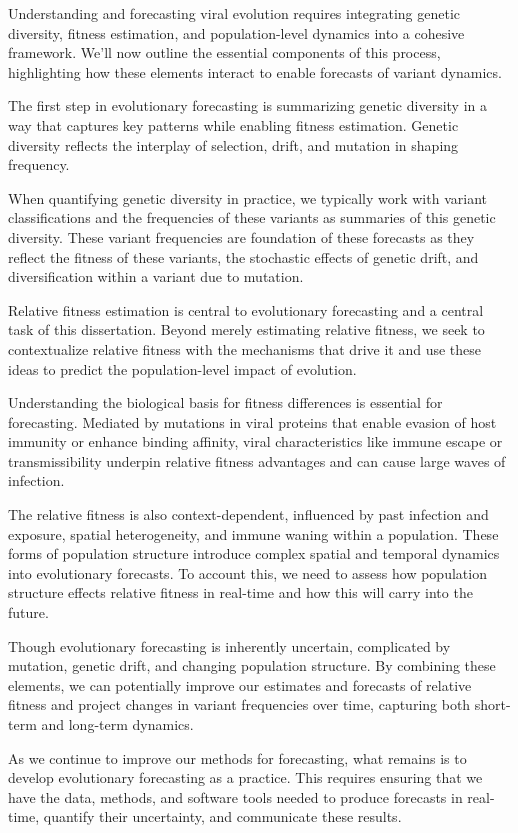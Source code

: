 Understanding and forecasting viral evolution requires integrating genetic diversity, fitness estimation, and population-level dynamics into a cohesive framework.
We'll now outline the essential components of this process, highlighting how these elements interact to enable forecasts of variant dynamics.

The first step in evolutionary forecasting is summarizing genetic diversity in a way that captures key patterns  while enabling fitness estimation.
Genetic diversity reflects the interplay of selection, drift, and mutation in shaping frequency.

When quantifying genetic diversity in practice, we typically work with variant classifications and the frequencies of these variants as summaries of this genetic diversity.
These variant frequencies are foundation of these forecasts as they reflect the fitness of these variants, the stochastic effects of genetic drift, and diversification within a variant due to mutation.

Relative fitness estimation is central to evolutionary forecasting and a central task of this dissertation.
Beyond merely estimating relative fitness, we seek to contextualize relative fitness with the mechanisms that drive it and use these ideas to predict the population-level impact of evolution.

Understanding the biological basis for fitness differences is essential for forecasting.
Mediated by mutations in viral proteins that enable evasion of host immunity or enhance binding affinity, viral characteristics like immune escape or transmissibility underpin relative fitness advantages and can cause large waves of infection.

The relative fitness is also context-dependent, influenced by past infection and exposure, spatial heterogeneity, and immune waning within a population.
These forms of population structure introduce complex spatial and temporal dynamics into evolutionary forecasts.
To account this, we need to assess how population structure effects relative fitness in real-time and how this will carry into the future.

Though evolutionary forecasting is inherently uncertain, complicated by mutation, genetic drift, and changing population structure.
By combining these elements, we can potentially improve our estimates and forecasts of relative fitness and project changes in variant frequencies over time, capturing both short-term and long-term dynamics.

As we continue to improve our methods for forecasting, what remains is to develop evolutionary forecasting as a practice.
This requires ensuring that we have the data, methods, and software tools needed to produce forecasts in real-time, quantify their uncertainty, and communicate these results.

